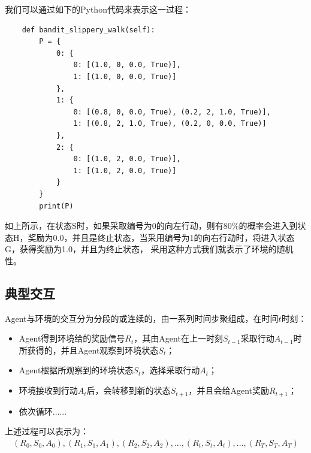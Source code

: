 我们可以通过如下的Python代码来表示这一过程：
\begin{lstlisting}
    def bandit_slippery_walk(self):
        P = {
            0: {
                0: [(1.0, 0, 0.0, True)],
                1: [(1.0, 0, 0.0, True)]
            },
            1: {
                0: [(0.8, 0, 0.0, True), (0.2, 2, 1.0, True)],
                1: [(0.8, 2, 1.0, True), (0.2, 0, 0.0, True)]
            },
            2: {
                0: [(1.0, 2, 0.0, True)],
                1: [(1.0, 2, 0.0, True)]
            }
        }
        print(P)
\end{lstlisting}
如上所示，在状态S时，如果采取编号为0的向左行动，则有80\%的概率会进入到状态H，奖励为0.0，并且是终止状态，当采用编号为1的向右行动时，将进入状态G，获得奖励为1.0，并且为终止状态，
采用这种方式我们就表示了环境的随机性。
\subsection{典型交互}
Agent与环境的交互分为分段的或连续的，由一系列时间步聚组成，在时间$t$时刻：
\begin{itemize}
    \item Agent得到环境给的奖励信号$R_{t}$，其由Agent在上一时刻$S_{t-1}$采取行动$A_{t-1}$时所获得的，并且Agent观察到环境状态$S_{t}$；
    \item Agent根据所观察到的环境状态$S_{t}$，选择采取行动$A_{t}$；
    \item 环境接收到行动$A_{t}$后，会转移到新的状态$S_{t+1}$，并且会给Agent奖励$R_{t+1}$；
    \item 依次循环......
\end{itemize}
上述过程可以表示为：
\begin{equation}
\begin{aligned}
(R_{0}, S_{0}, A_{0}), (R_{1}, S_{1}, A_{1}), (R_{2}, S_{2}, A_{2}), ..., (R_{t}, S_{t}, A_{t}), ..., (R_{T}, S_{T}, A_{T})
\end{aligned}
\label{mdp-episode-trajectory}
\end{equation}

